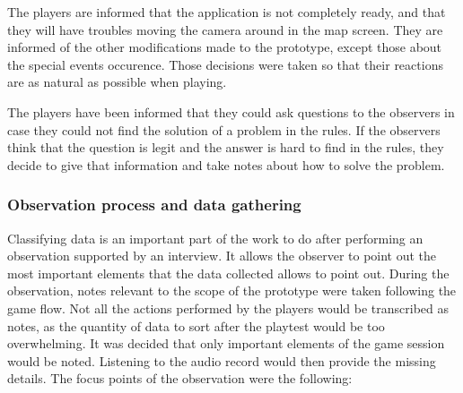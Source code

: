 The players are informed that the application is not completely ready, and that they will have troubles moving the camera around in the map screen. They are informed of the other modifications made to the prototype, except those about the special events occurence. Those decisions were taken so that their reactions are as natural as possible when playing.

The players have been informed that they could ask questions to the observers in case they could not find the solution of a problem in the rules. If the observers think that the question is legit and the answer is hard to find in the rules, they decide to give that information and take notes about how to solve the problem. 


\subsubsection{Observation process and data gathering}
Classifying data is an important part of the work to do after performing an observation supported by an interview. It allows the observer to point out the most important elements that the data collected allows to point out. During the observation, notes relevant to the scope of the prototype were taken following the game flow. Not all the actions performed by the players would be transcribed as notes, as the quantity of data to sort after the playtest would be too overwhelming. It was decided that only important elements of the game session would be noted. Listening to the audio record would then provide the missing details. The focus points of the observation were the following:
